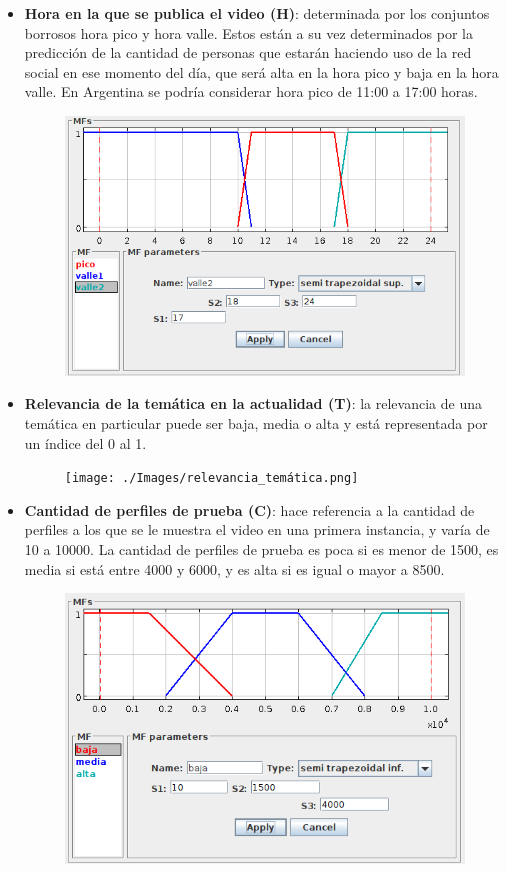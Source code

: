 \documentclass{article}
\begin{document}
\begin{itemize}
	\item \textbf{Hora en la que se publica el video (H)}: determinada por los conjuntos borrosos hora pico y hora valle. Estos están a su vez determinados por la predicción de la cantidad de personas que estarán haciendo uso de la red social en ese momento del día, que será alta en la hora pico y baja en la hora valle. En Argentina se podría considerar hora pico de 11:00 a 17:00 horas.
	\begin{figure}[H]
		\centering
		\includegraphics[scale=0.5]{./Images/hora_publicacion.png}
	\end{figure}
	\item \textbf{Relevancia de la temática en la actualidad (T)}: la relevancia de una temática en particular puede ser baja, media o alta y está representada por un índice del 0 al 1.
	\begin{figure}[H]
		\centering
		\texttt{[image: ./Images/relevancia\_temática.png]}
	\end{figure}
	\item \textbf{Cantidad de perfiles de prueba (C)}: hace referencia a la cantidad de perfiles a los que se le muestra el video en una primera instancia, y varía de 10 a 10000. La cantidad de perfiles de prueba es poca si es menor de 1500, es media si está entre 4000 y 6000, y es alta si es igual o mayor a 8500.
	\begin{figure}[H]
		\centering
		\includegraphics[scale=0.5]{./Images/perfiles_prueba_cant.png}

\end{figure}
\end{itemize}
\end{document}
